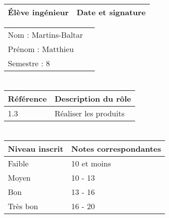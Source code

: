 \documentclass[11pt]{article}
\begin{document}

\begin{center}
\begin{table}[!hp]

	\begin{tabularx}{\linewidth}{|X|X|}
	\hline
	\rowcolor{gray!40} Élève ingénieur & Date et signature \\
	\hline
	\end{tabularx}
	\begin{tabularx}{\linewidth}{|X|X|}
	Nom : Martins-Baltar& \\ 
	Prénom : Matthieu& \\
	Semestre : 8& \\
	\hline
	\end{tabularx}
\end{table}
\end{center}

\section*{\large\FR}

\begin{table}[!hp]
\centering
	\begin{tabularx}{\linewidth}{|X|X|}
	\hline
	\rowcolor{gray!40} Référence \WBSCourt & Description du rôle \\
	\hline
	 1.3 & Réaliser les produits\\
	 \hline
	\end{tabularx}
\end{table}


\section*{\large\FC}


\begin{table}[!hp]
\centering
	\begin{tabularx}{\linewidth}{|X|X|}
	\hline
	\rowcolor{gray!40} Niveau inscrit & Notes correspondantes \\
	\hline
	 Faible & 10 et moins \\
	 \hline
	 Moyen & 10 - 13 \\
	 \hline
	 Bon & 13 - 16 \\
	 \hline
	 Très bon & 16 - 20 \\
	 \hline
	\end{tabularx}
\end{table}
\end{document}
